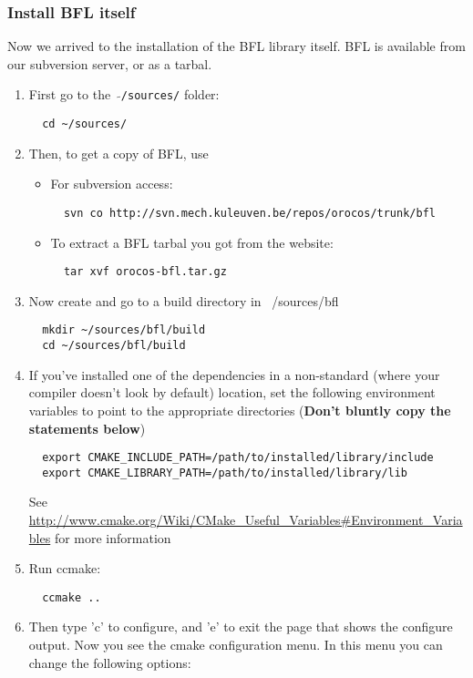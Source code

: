 \documentclass[a4paper,10pt]{article}
\begin{document}
\subsubsection{Install BFL itself}
Now we arrived to the installation of the BFL library itself. BFL is
available from our subversion server, or as a tarbal.
\begin{enumerate}
\item First go to the \ $\mathtt{\tilde{ }}$\texttt{/sources/} folder:
\begin{verbatim}
  cd ~/sources/
\end{verbatim}
\item Then, to get a copy of BFL, use
 \begin{itemize}
 \item For subversion access:
\begin{verbatim}
  svn co http://svn.mech.kuleuven.be/repos/orocos/trunk/bfl
\end{verbatim}
 \item To extract a BFL tarbal you got from the website:
\begin{verbatim}
  tar xvf orocos-bfl.tar.gz
\end{verbatim}
\end{itemize}
\item Now create and go to a build directory in ~/sources/bfl
\begin{verbatim}
  mkdir ~/sources/bfl/build
  cd ~/sources/bfl/build
\end{verbatim}
\item If you've installed one of the dependencies in a non-standard
  (where your compiler doesn't look by default) location, set the
  following environment variables to point to the appropriate
  directories (\textbf{Don't bluntly copy the statements below})
\begin{verbatim}
  export CMAKE_INCLUDE_PATH=/path/to/installed/library/include
  export CMAKE_LIBRARY_PATH=/path/to/installed/library/lib
\end{verbatim}
  See
  \url{http://www.cmake.org/Wiki/CMake_Useful_Variables#Environment_Variables}
  for more information
\item Run ccmake:
\begin{verbatim}
  ccmake ..
\end{verbatim}
\item Then type 'c' to configure, and 'e' to exit the page that shows
  the configure output. Now you see the cmake configuration menu. In
  this menu you can change the following options:

\end{enumerate}
\end{document}
